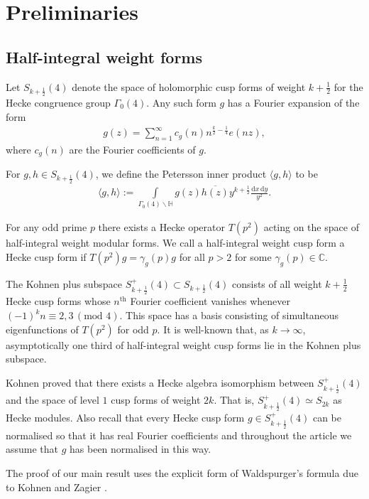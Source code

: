 \documentclass[a4paper,10pt,twoside]{amsart}
\theoremstyle{definition}
\numberwithin{equation}{section}
\renewcommand\:{\colon}
\begin{document}
\section{Preliminaries}

\subsection{Half-integral weight forms}
 
Let $S_{k+\frac12}(4)$ denote the space of holomorphic cusp forms of weight $k+\frac12$ for the Hecke congruence group $\Gamma_0(4)$. Any such form $g$ has a Fourier expansion of the form
\begin{align}\label{Fourier-exp}
g(z)=\sum_{n=1}^\infty c_g(n)n^{\frac k2-\frac14}e(nz),
\end{align}
where $c_g(n)$ are the Fourier coefficients of $g$.

For $g,h\in S_{k+\frac12}(4)$, we define the Petersson inner product $\langle g,h\rangle$ to be
\begin{align}\label{Inner_product}
\langle g,h\rangle:=\int\limits_{\Gamma_0(4)\backslash\mathbb H}g(z)\overline{ h(z)}y^{k+\frac12}\frac{\mathrm d x\,\mathrm d y}{y^2}.
\end{align}

\noindent For any odd prime $p$ there exists a Hecke operator $T(p^2)$ acting on the space of half-integral weight modular forms. We call a half-integral weight cusp form a Hecke cusp form if $T(p^2)g=\gamma_g(p)g$ for all $p>2$ for some $\gamma_g(p)\in\mathbb C$. 

The Kohnen plus subspace $S_{k+\frac12}^+(4)\subset S_{k+\frac12}(4)$ consists of all weight $k+\frac12$ Hecke cusp forms whose $n^{\text{th}}$ Fourier coefficient vanishes whenever $(-1)^k n\equiv 2,3\,(\text{mod }4)$. This space has a basis consisting of simultaneous eigenfunctions of $T(p^2)$ for odd $p$. It is well-known that, as $k\longrightarrow\infty$, asymptotically one third of half-integral weight cusp forms lie in the Kohnen plus subspace. 

Kohnen proved \cite{Kohnen1982} that there exists a Hecke algebra isomorphism between $S^+_{k+\frac12}(4)$ and the space of level $1$ cusp forms of weight $2k$. That is, $S^+_{k+\frac12}(4)\simeq S_{2k}$ as Hecke modules. Also recall that every Hecke cusp form $g\in S^+_{k+\frac12}(4)$ can be normalised so that it has real Fourier coefficients and throughout the article we assume that $g$ has been normalised in this way.

The proof of our main result uses the explicit form of Waldspurger's formula due to Kohnen and Zagier \cite{Kohnen-Zagier1981}.
\end{document}
